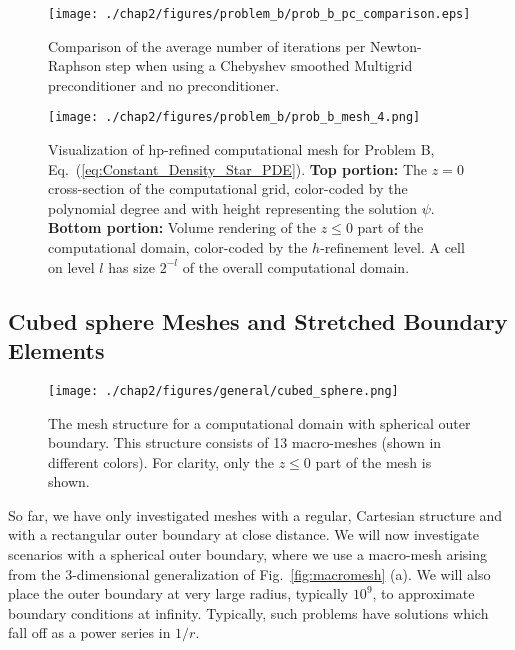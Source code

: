 \begin{figure}[ht!]
  \centering
 \texttt{[image: ./chap2/figures/problem\_b/prob\_b\_pc\_comparison.eps]}
  \caption{Comparison of the average number of iterations per Newton-Raphson step when using a Chebyshev smoothed Multigrid preconditioner and no preconditioner.}
  \label{fig:problem_b_pc_comparison} 
\end{figure}


\begin{figure}[ht!]
  \centering
  \texttt{[image: ./chap2/figures/problem\_b/prob\_b\_mesh\_4.png]}
  \caption{ \label{fig:problem_b_mesh} Visualization of
      hp-refined computational mesh for Problem B,
      Eq.~(\ref{eq:Constant_Density_Star_PDE}).  {\bf Top portion:}
      The $z=0$ cross-section of the computational grid, color-coded
      by the polynomial degree and with height representing the
      solution $\psi$.  {\bf Bottom portion:} Volume rendering of the
      $z\le 0$ part of the computational domain, color-coded by the
      $h$-refinement level.  A cell on level $l$ has size $2^{-l}$ of
      the overall computational domain. }
\end{figure}

\subsection{Cubed sphere Meshes and Stretched Boundary Elements}
  \label{sec:CompactifiedLorentizan}

\begin{figure}[ht!]
  \centering
  \texttt{[image: ./chap2/figures/general/cubed\_sphere.png]}
  \caption{
The mesh structure for a computational domain with spherical outer boundary.  This structure consists of 13 macro-meshes (shown in different colors).  For clarity, only the $z\le 0$ part of the mesh is shown. }
  \label{fig:cubed_sphere_mesh}
\end{figure}

So far, we have only investigated meshes with a regular,
  Cartesian structure and with a rectangular outer boundary at close
  distance.  We will now investigate scenarios with a spherical outer
  boundary, where we use a macro-mesh arising from the 3-dimensional
  generalization of Fig.~\ref{fig:macromesh} (a).  We will also place
  the outer boundary at very large radius, typically $10^9$, to
  approximate boundary conditions at infinity. Typically, such problems have solutions which fall off as a
power series in $1/r$.

